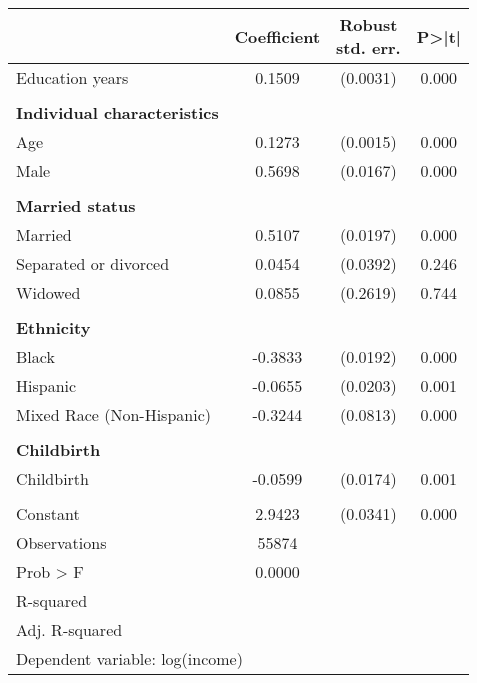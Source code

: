 {
\def\sym#1{\ifmmode^{#1}\else\(^{#1}\)\fi}
\begin{tabular}{l*{1}{ccc}}
\toprule
                    & Coefficient&\shortstack{Robust\\std. err.}&       P>|t|\\
\midrule
Education years     &      0.1509&    (0.0031)&       0.000\\
\\ \textbf{Individual characteristics}&            &            &            \\
Age                 &      0.1273&    (0.0015)&       0.000\\
Male                &      0.5698&    (0.0167)&       0.000\\
\\ \textbf{Married status}&            &            &            \\
Married             &      0.5107&    (0.0197)&       0.000\\
Separated or divorced&      0.0454&    (0.0392)&       0.246\\
Widowed             &      0.0855&    (0.2619)&       0.744\\
\\ \textbf{Ethnicity}&            &            &            \\
Black               &     -0.3833&    (0.0192)&       0.000\\
Hispanic            &     -0.0655&    (0.0203)&       0.001\\
Mixed Race (Non-Hispanic)&     -0.3244&    (0.0813)&       0.000\\
\\ \textbf{Childbirth}&            &            &            \\
Childbirth          &     -0.0599&    (0.0174)&       0.001\\
                    &            &            &            \\
Constant            &      2.9423&    (0.0341)&       0.000\\
\midrule
Observations        &       55874&            &            \\
Prob > F            &      0.0000&            &            \\
R-squared           &            &            &            \\
Adj. R-squared      &            &            &            \\
\bottomrule
\multicolumn{4}{l}{\footnotesize Dependent variable: log(income)}\\
\end{tabular}
}
